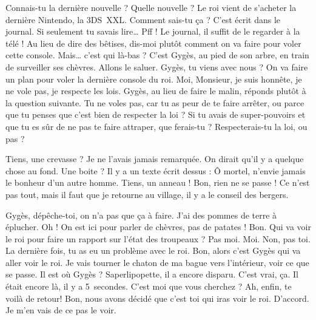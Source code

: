 \documentclass[12pt, a5paper, french]{memoir}
\begin{document}
\newpage
\pagestyle{myps}
\begin{linenumbers}


\scene[Gygès]
\StageDir{\Gyges, \Bonnie, \Clyde}
\begin{drama}
\Bonniespeaks Connais-tu la dernière nouvelle ?
\Clydespeaks Quelle nouvelle ?
\Bonniespeaks Le roi vient de s’acheter la dernière Nintendo, la 3DS~XXL.
\Clydespeaks Comment sais-tu ça ?
\Bonniespeaks C’est écrit dans le journal. Si seulement tu savais lire\dots
\Clydespeaks Pff ! Le journal, il suffit de le regarder à la télé !
\Bonniespeaks Au lieu de dire des bêtises, dis-moi plutôt comment on va faire pour voler cette console.
\Clydespeaks Mais\dots{} c’est qui là-bas ?
\Bonniespeaks C’est Gygès, au pied de son arbre, en train de surveiller ses chèvres.
\Clydespeaks Allons le saluer.  Gygès, tu viens avec nous ? On va faire un plan pour voler la dernière console du roi.
\Gygesspeaks Moi, Monsieur, je suis honnête, je ne vole pas, je respecte les lois.
\newpage
\Bonniespeaks Gygès, au lieu de faire le malin, réponds plutôt à la question suivante. Tu ne voles pas, car tu as peur de te faire arrêter, ou parce que tu penses que c’est bien de respecter la loi ? Si tu avais de super-pouvoirs et que tu es sûr de ne pas te faire attraper, que ferais-tu ? Respecterais-tu la loi, ou pas ?

\scene[L’anneau]
\StageDir{\Gyges}
\Gygesspeaks Tiens, une crevasse ? Je ne l’avais jamais remarquée. On dirait qu’il y a quelque chose au fond. Une boite ? Il y a un texte écrit dessus : \og Ô mortel, n’envie jamais le bonheur d’un autre homme. \fg{}  Tiens, un anneau !  Bon, rien ne se passe ! Ce n’est pas tout, mais il faut que je retourne au village, il y a le conseil des bergers.
\newpage

\scene[La mission]
\StageDir{\Gyges, \Leonardo, \Donatello, \Michelangelo, \Raffaello, \Tiziano}
\Leonardospeaks Gygès, dépêche-toi, on n’a pas que ça à faire. J’ai des pommes de terre à éplucher.
\Donatellospeaks Oh ! On est ici pour parler de chèvres, pas de patates !
\Michelangelospeaks Bon. Qui va voir le roi pour faire un rapport sur l'état des troupeaux ?
\Raffaellospeaks Pas moi.
\Tizianospeaks Moi.
\Donatellospeaks Non, pas toi. La dernière fois, tu as eu un problème avec le roi.
\Leonardospeaks Bon, alors c’est Gygès qui va aller voir le roi.
\Gygesspeaks {} Je vais tourner le chaton de ma bague vers l’intérieur, voir ce que se passe.
\Leonardospeaks Il est où Gygès ? Saperlipopette, il a encore disparu.
\Raffaellospeaks C’est vrai, ça. Il était encore là, il y a 5~secondes.
\newpage
\Gygesspeaks {} C’est moi que vous cherchez ?
\Tizianospeaks Ah, enfin, te voilà de retour! Bon, nous avons décidé que c’est toi qui iras voir le roi.
\Gygesspeaks D’accord. Je m’en vais de ce pas le voir.


\end{drama}
\end{linenumbers}
\end{document}
